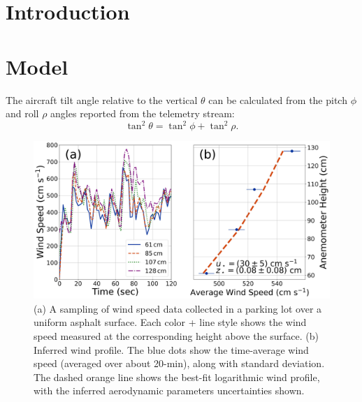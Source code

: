 \documentclass[linenumbers]{aastex631}
\begin{document}
\section{Introduction} \label{sec:Introduction}


\section{Model}

The aircraft tilt angle relative to the vertical $\theta$ can be calculated from the pitch $\phi$ and roll $\rho$ angles reported from the telemetry stream:
\begin{equation}
    \tan^2\theta = \tan^2 \phi + \tan^2 \rho.\label{eqn:tilt}
\end{equation}



\begin{figure}
    \centering
    \includegraphics[width=\textwidth]{figures and data/Alamosa_Parking_Lot_Windspeeds.jpg}
    \caption{(a) A sampling of wind speed data collected in a parking lot over a uniform asphalt surface. Each color + line style shows the wind speed measured at the corresponding height above the surface. (b) Inferred wind profile. The blue dots show the time-average wind speed (averaged over about 20-min), along with standard deviation. The dashed orange line shows the best-fit logarithmic wind profile, with the inferred aerodynamic parameters uncertainties shown.}
    \label{fig:Alamosa_Parking_Lot_Windspeeds}
\end{figure}
\end{document}

